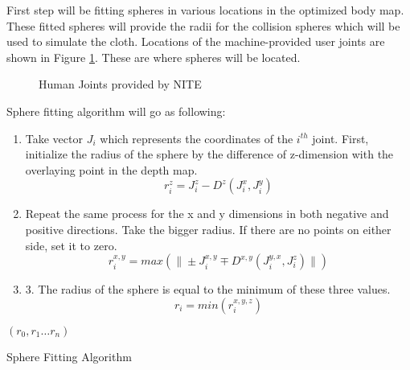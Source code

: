 First step will be fitting spheres in various locations in the optimized body
map. These fitted spheres will provide the radii for the collision spheres which
will be used to simulate the cloth. Locations of the machine-provided user
joints are shown in Figure \ref{fig:nite_joints}. These are where spheres will
be located.

\begin{figure}[h]
\centerline{}
\caption{Human Joints provided by NITE }
\label{fig:nite_joints}
\end{figure}

Sphere fitting algorithm will go as following:
\begin{enumerate}
\item Take vector $J_i$ which represents the coordinates of the $i^{th}$
joint.
First, initialize the radius of the sphere by the difference of z-dimension with the overlaying point in the depth map.
\begin{equation}
r_i^z=J_i^z-D^z(J_i^x,J_i^y)
\label{eqn:z_sphere_radius}
\end{equation}
\item Repeat the same process for the x and y dimensions in both negative and positive directions. Take the bigger radius. If there are no points on either side, set it to zero.
\begin{equation}
r_i^{x,y}=max(\| \pm J_i^{x,y} \mp D^{x,y}(J_i^{y,x},J_i^z)\|)
\label{eqn:x_y_sphere_radius}
\end{equation}
\item 3. The radius of the sphere is equal to the minimum of these three values.
\begin{equation}
r_i=min(r_i^{x,y,z})
\label{eqn:minimum_sphere-radius}
\end{equation}
\end{enumerate}

\begin{algorithm}
\dontprintsemicolon %
\Return $(r_0,r_1 \ldots r_n)$ 
\caption{Sphere Fitting Algorithm}
\label{algo:sphere_fitting}
\end{algorithm}

